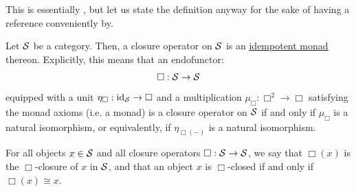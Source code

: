                     \begin{definition}[Closure] \label{def: closure}
                        This is essentially \cite[Definition 2.1]{nlab:closure_operator}, but let us state the definition anyway for the sake of having a reference conveniently by.
                        
                        Let $\S$ be a category. Then, a closure operator on $\S$ is an \href{https://ncatlab.org/nlab/show/idempotent+monad}{\underline{idempotent monad}} thereon. Explicitly, this means that an endofunctor:
                            $$\Box: \S \to \S$$
                        equipped with a unit $\eta_{\Box}: \id_{\S} \to \Box$ and a multiplication $\mu_{\Box}: \Box^2 \to \Box$ satisfying the monad axioms (i.e. a monad) is a closure operator on $\S$ if and only if $\mu_{\Box}$ is a natural isomorphism, or equivalently, if $\eta_{\Box(-)}$ is a natural isomorphism.
                        
                        For all objects $x \in \S$ and all closure operators $\Box: \S \to \S$, we say that $\Box(x)$ is the $\Box$-closure of $x$ in $\S$, and that an object $x$ is $\Box$-closed if and only if $\Box(x) \cong x$. 
                    \end{definition} 
